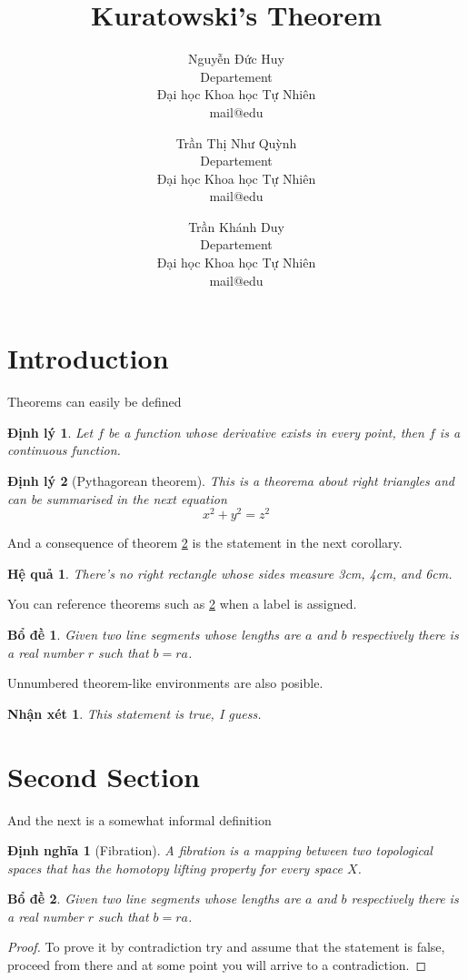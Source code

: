 \documentclass[10pt]{article}
\title{\textbf{Kuratowski's Theorem}}
\author{
    Nguyễn Đức Huy \\
    Departement \\
    Đại học Khoa học Tự Nhiên \\
    mail@edu
    \and
    Trần Thị Như Quỳnh \\
    Departement \\
    Đại học Khoa học Tự Nhiên \\
    mail@edu
    \and
    Trần Khánh Duy \\
    Departement \\
    Đại học Khoa học Tự Nhiên \\
    mail@edu
}
\newtheorem{theorem}{Định lý}
\newtheorem{corollary}{Hệ quả}
\newtheorem{lemma}{Bổ đề}
\newtheorem*{remark}{Nhận xét}
\newtheorem{definition}{Định nghĩa}
\begin{document}
\maketitle

\section{Introduction}
Theorems can easily be defined

\begin{theorem}
    Let $f$ be a function whose derivative exists in every point, then $f$ is
    a continuous function.
\end{theorem}

\begin{theorem}[Pythagorean theorem]
    \label{pythagorean}
    This is a theorema about right triangles and can be summarised in the next
    equation
    \[ x^2 + y^2 = z^2 \]
\end{theorem}

And a consequence of theorem \ref{pythagorean} is the statement in the next
corollary.

\begin{corollary}
    There's no right rectangle whose sides measure 3cm, 4cm, and 6cm.
\end{corollary}

You can reference theorems such as \ref{pythagorean} when a label is assigned.

\begin{lemma}
    Given two line segments whose lengths are $a$ and $b$ respectively there is a
    real number $r$ such that $b=ra$.
\end{lemma}
Unnumbered theorem-like environments are also posible.

\begin{remark}
    This statement is true, I guess.
\end{remark}
\section{Second Section}
And the next is a somewhat informal definition

\begin{definition}[Fibration]
    A fibration is a mapping between two topological spaces that has the homotopy lifting property for every space $X$.
\end{definition}


\begin{lemma}
    Given two line segments whose lengths are $a$ and $b$ respectively there
    is a real number $r$ such that $b=ra$.
\end{lemma}

\begin{proof}
    To prove it by contradiction try and assume that the statement is false,
    proceed from there and at some point you will arrive to a contradiction.
\end{proof}
\end{document}
